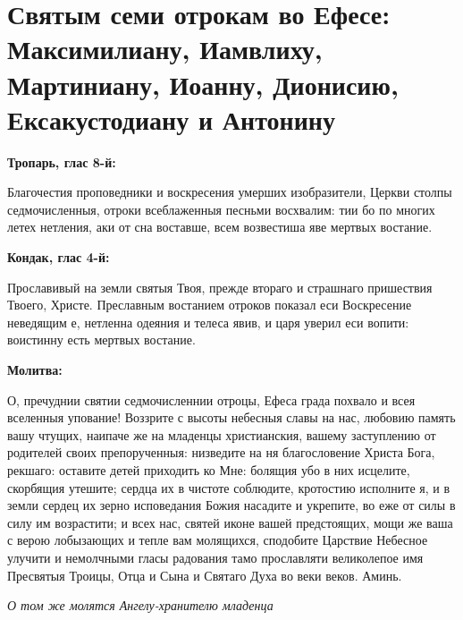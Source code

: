 \bigskip\bigskip\mychapterending


 

\section{Святым семи отрокам во Ефесе: Максимилиану, Иамвлиху, Мартиниану, Иоанну, Дионисию, Ексакустодиану и Антонину}
 
\bfseries Тропарь, глас 8-й:\normalfont{}


Благочестия проповедники и воскресения умерших изобразители, Церкви столпы седмочисленныя, отроки всеблаженныя песньми восхвалим: тии бо по многих летех нетления, аки от сна воставше, всем возвестиша яве мертвых востание.


\medskip
\bfseries Кондак, глас 4-й:\normalfont{}


Прославивый на земли святыя Твоя, прежде втораго и страшнаго пришествия Твоего, Христе. Преславным востанием отроков показал еси Воскресение неведящим е, нетленна одеяния и телеса явив, и царя уверил еси вопити: воистинну есть мертвых востание.


\medskip
\bfseries Молитва:\normalfont{}


О, пречуднии святии седмочисленнии отроцы, Ефеса града похвало и всея вселенныя упование! Воззрите с высоты небесныя славы на нас, любовию память вашу чтущих, наипаче же на младенцы христианския, вашему заступлению от родителей своих препорученныя: низведите на ня благословение Христа Бога, рекшаго: оставите детей приходить ко Мне: болящия убо в них исцелите, скорбящия утешите; сердца их в чистоте соблюдите, кротостию исполните я, и в земли сердец их зерно исповедания Божия насадите и укрепите, во еже от силы в силу им возрастити; и всех нас, святей иконе вашей предстоящих, мощи же ваша с верою лобызающих и тепле вам молящихся, сподобите Царствие Небесное улучити и немолчными гласы радования тамо прославляти великолепое имя Пресвятыя Троицы, Отца и Сына и Святаго Духа во веки веков. Аминь.

\itshape О том же молятся Ангелу-хранителю младенца\normalfont{} 



\bigskip\bigskip\mychapterending


